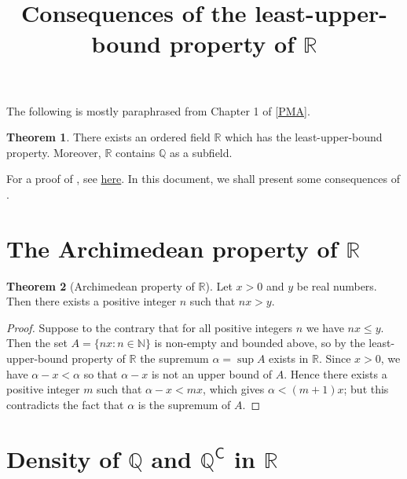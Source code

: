 \documentclass[12pt]{article}
\title{Consequences of the least-upper-bound property of \texorpdfstring{\( \mathbb{R} \)}{}}
\author{}
\date{\vspace{-24mm}}
\theoremstyle{definition}
\newtheorem{theorem}{Theorem}
\begin{document}
\maketitle

\tableofcontents

\newpage

\noindent The following is mostly paraphrased from Chapter 1 of \hyperlink{pma}{[PMA]}.

\begin{theorem}
\label{thm:R_exists}
    There exists an ordered field \( \mathbb{R} \) which has the least-upper-bound property. Moreover, \( \mathbb{R} \) contains \( \mathbb{Q} \) as a subfield.
\end{theorem}

For a proof of , see \href{https://lew98.github.io/Mathematics/Construction_of_R_from_Q_via_Dedekind_cuts.pdf}{here}. In this document, we shall present some consequences of .

\section{The Archimedean property of \texorpdfstring{\( \mathbb{R} \)}{}}
\label{sec:archimedean_property_of_R}

\begin{theorem}[Archimedean property of \( \mathbb{R} \)]
\label{thm:archimedean_property_of_R}
    Let \( x > 0 \) and \( y \) be real numbers. Then there exists a positive integer \( n \) such that \( nx > y \).
\end{theorem}

\begin{proof}
    Suppose to the contrary that for all positive integers \( n \) we have \( nx \leq y \). Then the set \( A = \{ nx : n \in \mathbb{N} \} \) is non-empty and bounded above, so by the least-upper-bound property of \( \mathbb{R} \) the supremum \( \alpha = \sup A \) exists in \( \mathbb{R} \). Since \( x > 0 \), we have \( \alpha - x < \alpha \) so that \( \alpha - x \) is not an upper bound of \( A \). Hence there exists a positive integer \( m \) such that \( \alpha - x < mx \), which gives \( \alpha < (m+1)x \); but this contradicts the fact that \( \alpha \) is the supremum of \( A \).
\end{proof}

\section{Density of \texorpdfstring{\( \mathbb{Q} \)}{} and \texorpdfstring{\( \mathbb{Q}^{\mathsf{C}} \)}{} in \texorpdfstring{\( \mathbb{R} \)}{}}
\end{document}
